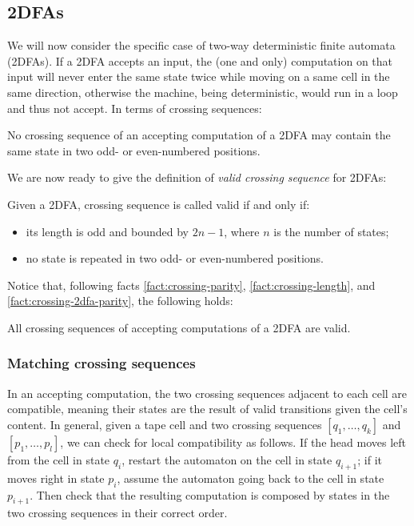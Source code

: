 \subsection{2DFAs}
We will now consider the specific case of two-way deterministic finite automata (2DFAs).
If a 2DFA accepts an input, the (one and only) computation on that input will never enter the same state twice while moving on a same cell in the same direction, otherwise the machine, being deterministic, would run in a loop and thus not accept.
In terms of crossing sequences:
\begin{fact}\label{fact:crossing-2dfa-parity}
	No crossing sequence of an accepting computation of a 2DFA may contain the same state in two odd- or even-numbered positions.
\end{fact}

We are now ready to give the definition of \emph{valid crossing sequence} for 2DFAs:
\begin{defn}
	Given a 2DFA, crossing sequence is called valid if and only if:
	\begin{itemize}
		\item its length is odd and bounded by $2n-1$, where $n$ is the number of states;
		\item no state is repeated in two odd- or even-numbered positions.
	\end{itemize}
\end{defn}


Notice that, following facts \ref{fact:crossing-parity}, \ref{fact:crossing-length}, and \ref{fact:crossing-2dfa-parity}, the following holds:
\begin{fact}
	All crossing sequences of accepting computations of a 2DFA are valid.
\end{fact}

\subsubsection{Matching crossing sequences}
In an accepting computation, the two crossing sequences adjacent to each cell are compatible, meaning their states are the result of valid transitions given the cell's content.
In general, given a tape cell and two crossing sequences $[q_1,\dots,q_k]$ and $[p_1,\dots,p_l]$, we can check for local compatibility as follows.
If the head moves left from the cell in state $q_i$, restart the automaton on the cell in state $q_{i+1}$; if it moves right in state $p_i$, assume the automaton going back to the cell in state $p_{i+1}$.
Then check that the resulting computation is composed by states in the two crossing sequences in their correct order.

